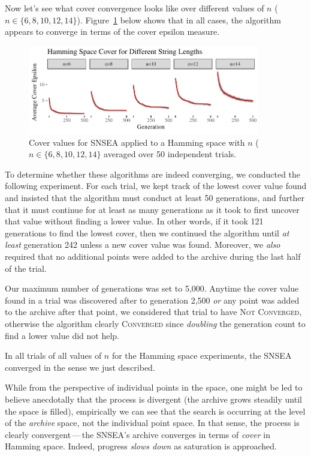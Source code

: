 \documentclass[twoside]{article}
\begin{document}
Now let's see what cover convergence looks like over different values of $n$ ($n\in\{6, 8, 10, 12, 14\}$).  Figure~\ref{fig:hamming:nopop:sm} below shows that in all cases, the algorithm appears to converge in terms of the cover epsilon measure.
%
\begin{figure}[h]
  \center\includegraphics[width=0.9\textwidth]{Figures/hamming-500sm-NOPOP.pdf}
  \caption{\label{fig:hamming:nopop:sm} Cover values for SNSEA applied to a Hamming space with $n$ ($n\in\{6, 8, 10, 12, 14\}$ averaged over 50 independent trials.}
\end{figure}

To determine whether these algorithms are indeed converging, we conducted the following experiment.  For each trial, we kept track of the lowest cover value found and insisted that the algorithm must conduct at least 50 generations, and further that it must continue for at least as many generations as it took to first uncover that value without finding a lower value.  In other words, if it took 121 generations to find the lowest cover, then we continued the algorithm until \emph{at least} generation 242 unless a new cover value was found.  Moreover, we \emph{also} required that no additional points were added to the archive during the last half of the trial.

Our maximum number of generations was set to 5,000.  Anytime the cover value found in a trial was discovered after to generation 2,500 \emph{or} any point was added to the archive after that point, we considered that trial to have \textsc{Not Converged}, otherwise the algorithm clearly \textsc{Converged} since \emph{doubling} the generation count to find a lower value did not help.  

In all trials of all values of $n$  for the Hamming space experiments, the SNSEA converged in the sense we just described.

While from the perspective of individual points in the space, one might be led to believe anecdotally that the process is divergent (the archive grows steadily until the space is filled), empirically we can see that the search is occurring at the level of the \emph{archive} space, not the individual point space.  In that sense, the process is clearly convergent\,---\,the SNSEA's archive converges in terms of \emph{cover} in Hamming space.  Indeed, progress \emph{slows down} as saturation is approached.
\end{document}
